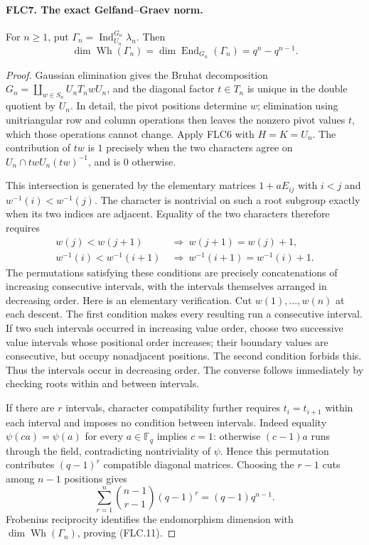\documentclass[11pt,a4paper]{article}
\numberwithin{equation}{section}
\theoremstyle{remark}\newtheorem{remark}[theorem]{Remark}
\begin{document}
\paragraph{FLC7. The exact Gelfand--Graev norm.}
\label{claim:FLC7}
For $n\ge1$, put $\Gamma_n=\operatorname{Ind}_{U_n}^{G_n}\lambda_n$.
Then
\[
 \dim\operatorname{Wh}(\Gamma_n)
       =\dim\operatorname{End}_{G_n}(\Gamma_n)
       =q^n-q^{n-1}.
 \tag{FLC.11}
\]
\begin{proof}
Gaussian elimination gives the Bruhat decomposition
$G_n=\coprod_{w\in S_n}U_n T_n w U_n$, and the diagonal factor
$t\in T_n$ is unique in the double quotient by $U_n$.
In detail, the pivot positions determine $w$; elimination using
unitriangular row and column operations then leaves the nonzero
pivot values $t$, which those operations cannot change.
Apply FLC6 with $H=K=U_n$.  The contribution of $tw$ is $1$
precisely when the two characters agree on
$U_n\cap twU_n(tw)^{-1}$, and is $0$ otherwise.

This intersection is generated by the elementary matrices
$1+aE_{ij}$ with $i<j$ and $w^{-1}(i)<w^{-1}(j)$.
The character is nontrivial on such a root subgroup exactly
when its two indices are adjacent.  Equality of the two
characters therefore requires
\[
 \begin{split}
 w(j)<w(j+1)&\ \Longrightarrow\ w(j+1)=w(j)+1,\\
 w^{-1}(i)<w^{-1}(i+1)&\ \Longrightarrow\
                  w^{-1}(i+1)=w^{-1}(i)+1.
 \end{split}
 \tag{FLC.12}
\]
The permutations satisfying these conditions are precisely
concatenations of increasing consecutive intervals, with the
intervals themselves arranged in decreasing order.
Here is an elementary verification.  Cut $w(1),\ldots,w(n)$
at each descent.  The first condition makes every resulting
run a consecutive interval.  If two such intervals occurred
in increasing value order, choose two successive value
intervals whose positional order increases; their boundary
values are consecutive, but occupy nonadjacent positions.
The second condition forbids this.  Thus the intervals occur
in decreasing order.  The converse follows immediately by
checking roots within and between intervals.

If there are $r$ intervals, character compatibility further
requires $t_i=t_{i+1}$ within each interval and imposes no
condition between intervals.  Indeed equality
$\psi(ca)=\psi(a)$ for every $a\in\mathbb F_q$ implies $c=1$:
otherwise $(c-1)a$ runs through the field, contradicting
nontriviality of $\psi$.  Hence this permutation contributes
$(q-1)^r$ compatible diagonal matrices.  Choosing the $r-1$
cuts among $n-1$ positions gives
\[
 \sum_{r=1}^n\binom{n-1}{r-1}(q-1)^r
                         =(q-1)q^{n-1}.
\]
Frobenius reciprocity identifies the endomorphism dimension
with $\dim\operatorname{Wh}(\Gamma_n)$, proving (FLC.11).
\end{proof}
\end{document}
